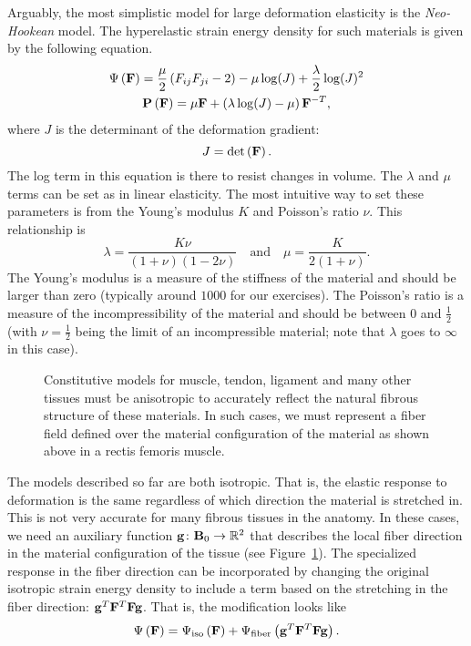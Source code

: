 Arguably, the most simplistic model for large deformation elasticity is the \emph{Neo-Hookean} model. The hyperelastic strain energy density for such materials is given by the following equation.
\begin{gather*}
\Psi \left( \mathbf{F} \right) = \frac{\mu}{2} \left( F_{ij} F_{ji} - 2 \right) - \mu \log(J) + \frac{\lambda}{2} \log(J)^2 \\
\mathbf{P} \left( \mathbf{F} \right) = \mu \mathbf{F} + \left( \lambda \log(J) - \mu \right) \mathbf{F}^{-T},
\end{gather*}
where  $J$ is the determinant of the deformation gradient:
\begin{equation*}
J = \det \left( \mathbf{F} \right).
\end{equation*}
The log term in this equation is there to resist changes in volume. The $\lambda$ and $\mu$ terms can be set as in linear elasticity. The most intuitive way to set these parameters is from the Young's modulus $K$ and Poisson's ratio $\nu$. This relationship is
\begin{equation*}
\lambda = \frac{K \nu}{(1 + \nu)(1 - 2\nu)} \quad \text{and} \quad \mu = \frac{K}{2 (1 + \nu)}.
\end{equation*}
The Young's modulus is a measure of the stiffness of the material and should be larger than zero (typically around $1000$ for our exercises). The Poisson's ratio is a measure of the incompressibility of the material and should be between 0 and $\frac{1}{2}$ (with $\nu = \frac{1}{2}$ being the limit of an incompressible material; note that $\lambda$ goes to $\infty$ in this case).

\begin{figure}
\caption{Constitutive models for muscle, tendon, ligament and many other tissues must be anisotropic to accurately reflect the natural fibrous structure of these materials. In such cases, we must represent a fiber field defined over the material configuration of the material as shown above in a rectis femoris muscle.}
\label{fig:fibers}
\end{figure}

The models described so far are both isotropic. That is, the elastic response to deformation is the same regardless of which direction the material is stretched in. This is not very accurate for many fibrous tissues in the anatomy. In these cases, we need an auxiliary function $\mathbf{g} \colon \mathbf{B}_0 \to \mathbb{R}^2$ that describes the local fiber direction in the material configuration of the tissue (see Figure~\ref{fig:fibers}). The specialized response in the fiber direction can be incorporated by changing the original isotropic strain energy density to include a term based on the stretching in the fiber direction: $\mathbf{g}^T \mathbf{F}^T \mathbf{F} \mathbf{g}$. That is, the modification looks like
\begin{equation*}
\Psi \left( \mathbf{F} \right) = \Psi_{\text{iso}} \left( \mathbf{F} \right) + \Psi_{\text{fiber}} \left( \mathbf{g}^T \mathbf{F}^T \mathbf{F} \mathbf{g} \right).
\end{equation*}

